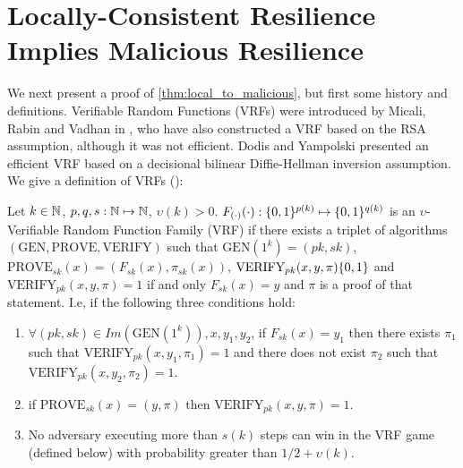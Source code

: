 \section{Locally-Consistent Resilience Implies Malicious Resilience}\label{sec:local_const}
We next present a proof of \cref{thm:local_to_malicious}, but first some history  and definitions. Verifiable Random Functions (VRFs) were introduced by Micali, Rabin and Vadhan in \cite{MRV99}, who have also constructed a VRF based on the RSA assumption, although it was not efficient. Dodis and Yampolski \cite{DY05} presented an efficient VRF based on a decisional bilinear Diffie-Hellman inversion assumption. We give a definition of VRFs (\cite{MRV99,DY05}):

\newcommand{\gen}{\text{GEN}}
\newcommand{\pro}{\text{PROVE}}
\newcommand{\ver}{\text{VERIFY}}

\begin{definition} \label{def:vrf}
	Let $k \in {\mathbb{N}}$, $p,q,s:{\mathbb{N}} \mapsto {\mathbb{N}}$, $\upsilon(k) > 0$. $F_{(\cdot)}(\cdot): \{0,1\}^{p(k)} \mapsto \{0,1\}^{q(k)}$ is an $\upsilon$-Verifiable Random Function Family (VRF) if there exists a triplet of algorithms $(\gen, \pro,\ver)$ such that $\gen(1^k) = (pk,sk)$, $\pro_{sk}(x) = (F_{sk}(x), \pi_{sk}(x))$, $\ver_{pk}(x,y,\pi) \zo$ and $\ver_{pk}(x,y,\pi) = 1$ if and only $F_{sk}(x) = y$ and $\pi$ is a proof of that statement. I.e, if the following three conditions hold:
	\begin{enumerate}
		\item $\forall (pk,sk) \in Im(\gen(1^k)), x, y_1, y_2$, if $F_{sk}(x) = y_1$ then there exists $\pi_1$ such that $\ver_{pk}(x,y_1,\pi_1) = 1$ and there does not exist $\pi_2$ such that $\ver_{pk}(x,y_2,\pi_2) = 1$.
		\item if $\pro_{sk}(x) = (y,\pi)$ then $\ver_{pk}(x,y,\pi) = 1$.
		\item No adversary executing more than $s(k)$ steps can win in the VRF game (defined below) with probability greater than $1/2 + \upsilon(k)$.
	\end{enumerate}
\end{definition}


